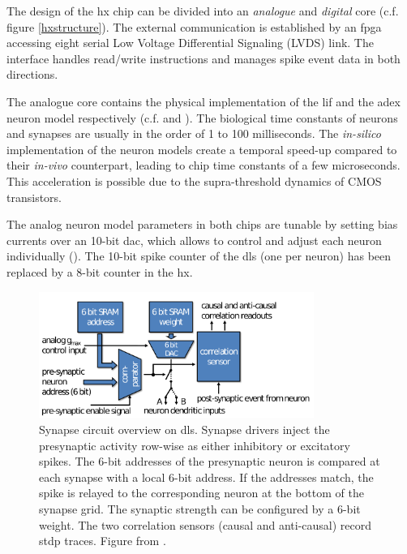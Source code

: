 The design of the \gls{hx} chip can be divided into an \emph{analogue} and \emph{digital} core (c.f. figure \ref{hxstructure}). The external communication is established by an \gls{fpga} accessing eight serial Low Voltage Differential Signaling (LVDS) link. The interface handles read/write instructions and manages spike event data in both directions.

The analogue core contains the physical implementation of the \gls{lif} and the \gls{adex} neuron model respectively (c.f. \citealp{aamir2018dls2neuron} and \citealp{aamir2018mixed}). The biological time constants of neurons and synapses are usually in the order of 1 to 100 milliseconds. The \textit{in-silico} implementation of the neuron models create a temporal speed-up compared to their \textit{in-vivo} counterpart, leading to chip time constants of a few microseconds. This acceleration is possible due to the supra-threshold dynamics of CMOS transistors. 

The analog neuron model parameters in both chips are tunable by setting bias currents over an 10-bit \gls{dac}, which allows to control and adjust each neuron individually (\citealp{hock13analogmemory}). The 10-bit spike counter of the \gls{dls} (one per neuron) has been replaced by a 8-bit counter in the \gls{hx}. 

\begin{figure}
	\centering
	\includegraphics[width=0.8\textwidth]{figures/synapse.png}
	\caption[Synapse circuit overview on \gls{dls}]{Synapse circuit overview on \gls{dls}. Synapse drivers inject the presynaptic activity row-wise as either inhibitory or excitatory spikes. The 6-bit addresses of the presynaptic neuron is compared at each synapse with a local 6-bit address. If the addresses match, the spike is relayed to the corresponding neuron at the bottom of the synapse grid. The synaptic strength can be configured by a 6-bit weight. The two correlation sensors (causal and anti-causal) record \gls{stdp} traces. Figure from \citealp{friedmann2016hybridlearning}.}
	\label{synapseschematics}
\end{figure}

